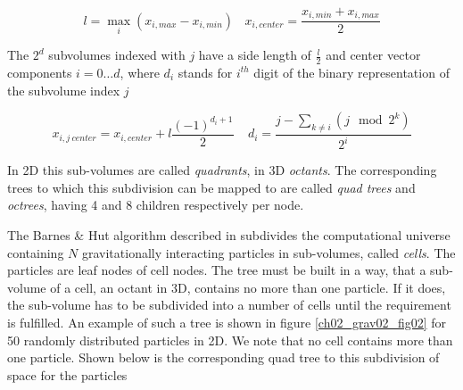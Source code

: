 \begin{equation}
\label{ch02_grav02_eq012}
l = \max_{i} ( x_{i,max} - x_{i,min})  ~~~~ x_{i,center}= \frac{ x_{i,min} + x_{i,max} }{2}
\end{equation}

The $2^{d}$ subvolumes indexed with $j$ have a side length of $\frac{l}{2}$ and center vector components $i = 0 \dots d$, where $d_{i}$ stands for $i^{th}$ digit of the binary representation of the subvolume index $j$

\begin{equation}
\label{ch02_grav02_eq013}
x_{i, j~center} = x_{i,center} + l \frac{(-1)^{d_{i} + 1}}{2} ~~~~~ d_{i} = \frac{j  - \sum_{k \ne i} ( j \mod 2^{k} )}{2^{i}}
\end{equation}

In 2D this sub-volumes are called \emph{quadrants}, in 3D \emph{octants}. The corresponding trees to which this subdivision can be mapped to are called \emph{quad trees} and \emph{octrees}, having 4 and 8 children respectively per node.

The Barnes \& Hut algorithm described in \cite{Barnes:1986p2853} subdivides the computational universe containing $N$ gravitationally interacting particles in sub-volumes, called \emph{cells}. The particles are leaf nodes of cell nodes. The tree must be built in a way, that a sub-volume of a cell, an octant in 3D, contains no more than one particle. If it does, the sub-volume has to be subdivided into a number of cells until the requirement is fulfilled. An example of such a tree is shown in figure \ref{ch02_grav02_fig02} for 50 randomly distributed particles in 2D. We note that no cell contains more than one particle. Shown below is the corresponding quad tree to this subdivision of space for the particles

